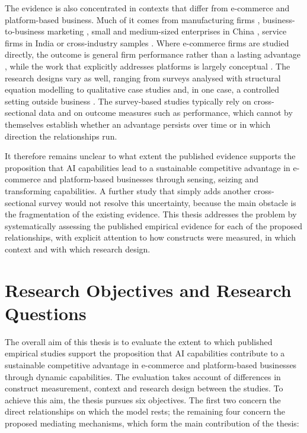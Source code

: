 The evidence is also concentrated in contexts that differ from e-commerce and platform-based business. Much of it comes from manufacturing firms \parencite{sjodin2021, chatterjee2021}, business-to-business marketing \parencite{mikalef2021b2b, mikalef2023}, small and medium-sized enterprises in China \parencite{shao2026}, service firms in India \parencite{rana2022} or cross-industry samples \parencite{selgascors2026}. Where e-commerce firms are studied directly, the outcome is general firm performance rather than a lasting advantage \parencite{chen2022}, while the work that explicitly addresses platforms is largely conceptual \parencite{gregory2021, cennamo2021}. The research designs vary as well, ranging from surveys analysed with structural equation modelling to qualitative case studies and, in one case, a controlled setting outside business \parencite{krakowski2023}. The survey-based studies typically rely on cross-sectional data and on outcome measures such as performance, which cannot by themselves establish whether an advantage persists over time or in which direction the relationships run.

It therefore remains unclear to what extent the published evidence supports the proposition that AI capabilities lead to a sustainable competitive advantage in e-commerce and platform-based businesses through sensing, seizing and transforming capabilities. A further study that simply adds another cross-sectional survey would not resolve this uncertainty, because the main obstacle is the fragmentation of the existing evidence. This thesis addresses the problem by systematically assessing the published empirical evidence for each of the proposed relationships, with explicit attention to how constructs were measured, in which context and with which research design.

\section{Research Objectives and Research Questions}
\label{sec:objectives}

The overall aim of this thesis is to evaluate the extent to which published empirical studies support the proposition that AI capabilities contribute to a sustainable competitive advantage in e-commerce and platform-based businesses through dynamic capabilities. The evaluation takes account of differences in construct measurement, context and research design between the studies. To achieve this aim, the thesis pursues six objectives. The first two concern the direct relationships on which the model rests; the remaining four concern the proposed mediating mechanisms, which form the main contribution of the thesis:

